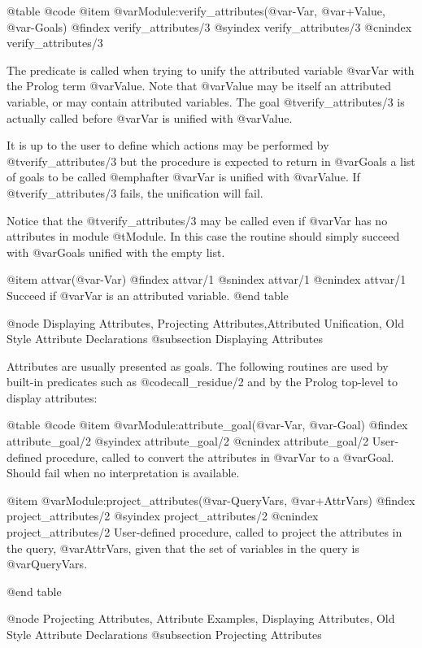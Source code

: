 {{{{{{{{{@table @code
@item @var{Module}:verify_attributes(@var{-Var}, @var{+Value}, @var{-Goals})
@findex verify_attributes/3
@syindex verify_attributes/3
@cnindex verify_attributes/3

The predicate is called when trying to unify the attributed variable
@var{Var} with the Prolog term @var{Value}. Note that @var{Value} may be
itself an attributed variable, or may contain attributed variables.  The
goal @t{verify_attributes/3} is actually called before @var{Var} is
unified with @var{Value}.

It is up to the user to define which actions may be performed by
@t{verify_attributes/3} but the procedure is expected to return in
@var{Goals} a list of goals to be called @emph{after} @var{Var} is
unified with @var{Value}. If @t{verify_attributes/3} fails, the
unification will fail.

Notice that the @t{verify_attributes/3} may be called even if @var{Var}
has no attributes in module @t{Module}. In this case the routine should
simply succeed with @var{Goals} unified with the empty list.

@item attvar(@var{-Var})
@findex attvar/1
@snindex attvar/1
@cnindex attvar/1
Succeed if @var{Var} is an attributed variable.
@end table



@node Displaying Attributes, Projecting Attributes,Attributed Unification, Old Style Attribute Declarations 
@subsection Displaying Attributes

Attributes are usually presented as goals. The following routines are
used by built-in predicates such as @code{call_residue/2} and by the
Prolog top-level to display attributes:

@table @code
@item @var{Module}:attribute_goal(@var{-Var}, @var{-Goal})
@findex attribute_goal/2
@syindex attribute_goal/2
@cnindex attribute_goal/2
User-defined procedure, called to convert the attributes in @var{Var} to
a @var{Goal}. Should fail when no interpretation is available.

@item @var{Module}:project_attributes(@var{-QueryVars}, @var{+AttrVars})
@findex project_attributes/2
@syindex project_attributes/2
@cnindex project_attributes/2
User-defined procedure, called to project the attributes in the query,
@var{AttrVars}, given that the set of variables in the query is
@var{QueryVars}.

@end table

@node Projecting Attributes, Attribute Examples, Displaying Attributes, Old Style Attribute Declarations
@subsection Projecting Attributes

}}}}}}}}}

